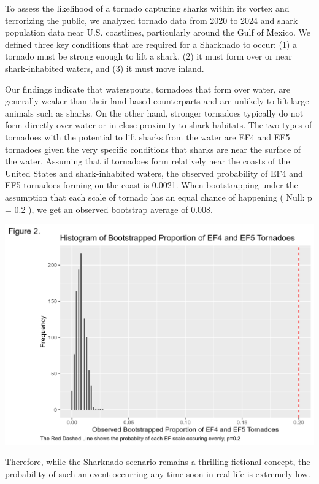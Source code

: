 \documentclass[
  letterpaper,
  DIV=11,
  numbers=noendperiod]{scrreprt}
\begin{document}
To assess the likelihood of a tornado capturing sharks within its vortex
and terrorizing the public, we analyzed tornado data from 2020 to 2024
and shark population data near U.S. coastlines, particularly around the
Gulf of Mexico. We defined three key conditions that are required for a
Sharknado to occur: (1) a tornado must be strong enough to lift a shark,
(2) it must form over or near shark-inhabited waters, and (3) it must
move inland.

Our findings indicate that waterspouts, tornadoes that form over water,
are generally weaker than their land-based counterparts and are unlikely
to lift large animals such as sharks. On the other hand, stronger
tornadoes typically do not form directly over water or in close
proximity to shark habitats. The two types of tornadoes with the
potential to lift sharks from the water are EF4 and EF5 tornadoes given
the very specific conditions that sharks are near the surface of the
water. Assuming that if tornadoes form relatively near the coasts of the
United States and shark-inhabited waters, the observed probability of
EF4 and EF5 tornadoes forming on the coast is 0.0021. When bootstrapping
under the assumption that each scale of tornado has an equal chance of
happening ( Null: p = 0.2 ), we get an observed bootstrap average of
0.008.

\includegraphics{bootstrap_histogram.png}

Therefore, while the Sharknado scenario remains a thrilling fictional
concept, the probability of such an event occurring any time soon in
real life is extremely low.
\end{document}
